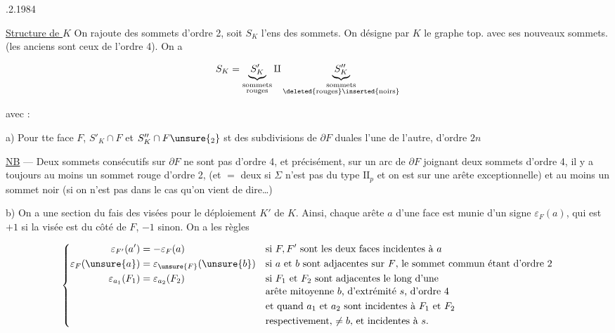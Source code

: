 
.2.1984

\uline{Structure de $K$} On rajoute des sommets d'ordre 2, soit $S_K$ l'ens des sommets. On désigne par $K$ le graphe top. avec ses nouveaux sommets. (les anciens sont ceux de l'ordre 4). On a

\[ S_K=\underbrace{S'_K}_{\substack{\text{sommets}\\\text{rouges}}}\amalg
\underbrace{S''_K}_{\substack{\text{sommets}\\\text{\deleted{rouges}\inserted{noirs}}}} \]


avec :

a) Pour tte  face $F$, $S'_K\cap F$ et $S''_K\cap F\unsure{_2}$ st des subdivisions de $\partial F$ duales l'une de l'autre, d'ordre $2n$

 \uline{NB} --- Deux sommets consécutifs sur $\partial F$ ne sont pas d'ordre 4, et  précisément,  sur un arc de $\partial F$ joignant deux sommets d'ordre 4, il y a toujours au moins un sommet rouge d'ordre 2, (et $=$ deux si $\Sigma$ n'est pas  du type $\mathrm{II}_p$ et on est sur une arête exceptionnelle) et au moins un sommet noir (si on n'est  pas dans le cas qu'on vient de dire\ldots)

b)  On a une section du fais des visées pour le déploiement $K'$ de $K$. Ainsi, chaque arête $a$ d'une face  est munie d'un signe $\varepsilon_F(a)$, qui est \deleted{\unsure{$\pm$}}$+1$ si la visée est du côté de $F$, $-1$ sinon. On a les règles

\[
\left\{\begin{aligned}
\varepsilon_{F'}(a')&=-\varepsilon_F(a) &&\text{si $F,F'$ sont les deux faces incidentes à $a$}\\
\varepsilon_F(\unsure{a})&=\varepsilon_{\unsure{F}}(\unsure{b}) &&\text{si $a$ et $b$ sont adjacentes sur $F$, le sommet commun étant d'ordre 2}\\
\varepsilon_{a_1}(F_1)&=\varepsilon_{a_2}(F_2) &&\text{si $F_1$ et $F_2$ sont adjacentes le long d'une}\\[-2pt]
&&&\text{arête mitoyenne $b$, d'extrémité $s$, d'ordre 4}\\
&&&\text{et quand $a_1$ et $a_2$ sont incidentes à $F_1$ et $F_2$}\\
&&&\text{respectivement, $\ne b$, et incidentes à $s$.}
\end{aligned}\right.
\]

